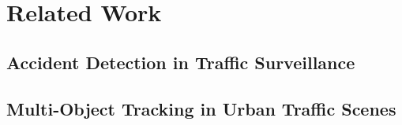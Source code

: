 %

\section{Related Work}
\label{sec:related}

\subsection{Accident Detection in Traffic Surveillance}
\label{subsec:rw_accident}

%


\subsection{Multi-Object Tracking in Urban Traffic Scenes}
\label{subsec:rw_mot}

%


